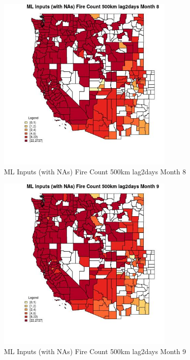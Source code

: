 \begin{figure} 
\centering  
\includegraphics[width=0.77\textwidth]{Code_Outputs/Report_ML_input_PM25_Step4_part_f_de_duplicated_aveswNAs_CountyFire_Count_500km_lag2daysmedianMonth8.jpg} 
\caption{\label{fig:Report_ML_input_PM25_Step4_part_f_de_duplicated_aveswNAsCountyFire_Count_500km_lag2daysmedianMonth8}ML Inputs (with NAs) Fire Count 500km lag2days Month 8} 
\end{figure} 
 

\clearpage 

\begin{figure} 
\centering  
\includegraphics[width=0.77\textwidth]{Code_Outputs/Report_ML_input_PM25_Step4_part_f_de_duplicated_aveswNAs_CountyFire_Count_500km_lag2daysmedianMonth9.jpg} 
\caption{\label{fig:Report_ML_input_PM25_Step4_part_f_de_duplicated_aveswNAsCountyFire_Count_500km_lag2daysmedianMonth9}ML Inputs (with NAs) Fire Count 500km lag2days Month 9} 
\end{figure} 
 

